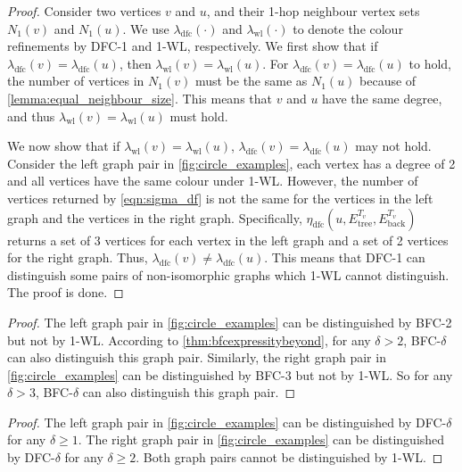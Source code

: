 \dfconewl*
\begin{proof}
    Consider two vertices $v$ and $u$, and their 1-hop neighbour vertex sets $N_1(v)$ and $N_1(u)$. We use $\lambda_{\text{dfc}}(\cdot)$ and $\lambda_{\text{wl}}(\cdot)$ to denote the colour refinements by DFC-1 and 1-WL, respectively.
    We first show that if $\lambda_{\text{dfc}}(v) = \lambda_{\text{dfc}}(u)$, then $\lambda_{\text{wl}}(v) = \lambda_{\text{wl}}(u)$. For $\lambda_{\text{dfc}}(v) = \lambda_{\text{dfc}}(u)$ to hold, the number of vertices in $N_1(v)$ must be the same as $N_1(u)$ because of \cref{lemma:equal_neighbour_size}. This means that $v$ and $u$ have the same degree, and thus $\lambda_{\text{wl}}(v) = \lambda_{\text{wl}}(u)$ must hold.
    
    We now show that if $\lambda_{\text{wl}}(v) = \lambda_{\text{wl}}(u)$, $\lambda_{\text{dfc}}(v) = \lambda_{\text{dfc}}(u)$ may not hold. Consider the left graph pair in \cref{fig:circle_examples}, each vertex has a degree of 2 and all vertices have the same colour under 1-WL. However, the number of vertices returned by \cref{eqn:sigma_df} is not the same for the vertices in the left graph and the vertices in the right graph. Specifically, $\eta_{\text{dfc}}(u,E_{\text{tree}}^{T_v},E_{\text{back}}^{T_v})$ returns a set of 3 vertices for each vertex in the left graph and a set of 2 vertices for the right graph. Thus, $\lambda_{\text{dfc}}(v) \neq \lambda_{\text{dfc}}(u)$. This means that DFC-1 can distinguish some pairs of non-isomorphic graphs which 1-WL cannot distinguish. The proof is done.
\end{proof}

\bfcdistinguish*
\begin{proof}
The left graph pair in \cref{fig:circle_examples} can be distinguished by BFC-2 but not by 1-WL. According to \cref{thm:bfcexpressitybeyond}, for any $\delta>2$, BFC-$\delta$ can also distinguish this graph pair. Similarly, the right graph pair in \cref{fig:circle_examples} can be distinguished by BFC-3 but not by 1-WL. So for any $\delta>3$, BFC-$\delta$ can also distinguish this graph pair.
\end{proof}

\dfcdistinguish*
\begin{proof}
The left graph pair in \cref{fig:circle_examples} can be distinguished by DFC-$\delta$ for any $\delta\geq 1$.
The right graph pair in \cref{fig:circle_examples} can be distinguished by DFC-$\delta$ for any $\delta\geq 2$. Both graph pairs cannot be distinguished by 1-WL.
\end{proof}




